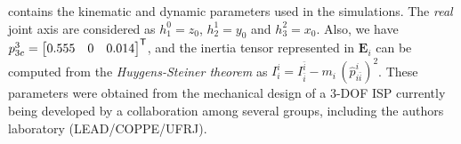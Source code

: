 {\renewcommand{\arraystretch}{1.5}%
\begin{table}[!htb]
\caption{Kinematic and dynamic model parameters, in SI units.}
\centering
\label{table:ISP_parameters}
\end{table}
}
%
 contains the kinematic and dynamic parameters used in the simulations.
%
The \textit{real} joint axis are considered as $h^{0}_1 \!=\! z_0$, $h^{1}_2 \!=\! y_0$ and $h^{2}_3 \!=\! x_0$. Also, we have $p^3_{3c} = \begin{bmatrix}0.555 & 0 & 0.014\end{bmatrix}^\mathsf{T}$, and the inertia tensor represented in $\mathbf{E}_{i}$ can be computed from the \textit{Huygens-Steiner theorem} as $I^{i}_{i} = I^{\bar{i}}_{\bar{i}} - m_i \, (\widehat{p}^{i}_{i\bar{i}})^2$.
%
%
These parameters were obtained from the mechanical design of a 3-DOF ISP currently being developed by a collaboration among several groups, including the authors laboratory (LEAD/COPPE/UFRJ).

